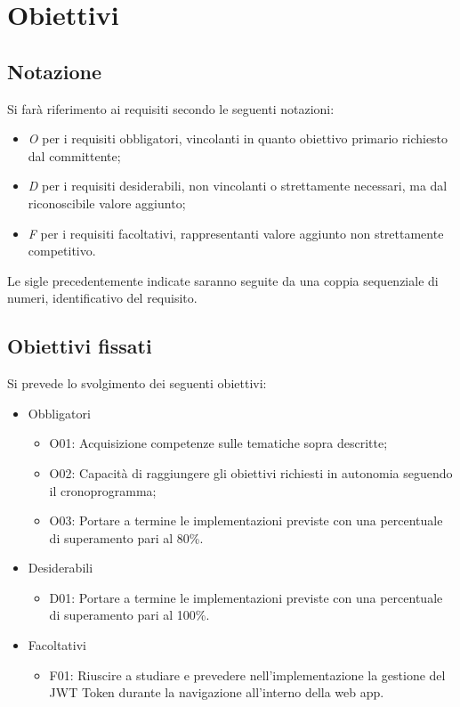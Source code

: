 \section*{Obiettivi}
\subsection*{Notazione}
Si farà riferimento ai requisiti secondo le seguenti notazioni:
\begin{itemize}
	\item \textit{O} per i requisiti obbligatori, vincolanti in quanto obiettivo primario richiesto dal committente;
	\item \textit{D} per i requisiti desiderabili, non vincolanti o strettamente necessari,
		  ma dal riconoscibile valore aggiunto;
	\item \textit{F} per i requisiti facoltativi, rappresentanti valore aggiunto non strettamente 
		  competitivo.
\end{itemize}

Le sigle precedentemente indicate saranno seguite da una coppia sequenziale di numeri, identificativo del requisito.

\subsection*{Obiettivi fissati}
Si prevede lo svolgimento dei seguenti obiettivi:
\begin{itemize}
	\item Obbligatori
	\begin{itemize}
		\item O01: Acquisizione competenze sulle tematiche sopra descritte;
		\item O02: Capacità di raggiungere gli obiettivi richiesti in autonomia seguendo il cronoprogramma;
		\item O03: Portare a termine le implementazioni previste con una percentuale di superamento pari al 80\%.
	\end{itemize}
	
	\item Desiderabili 
	\begin{itemize}
		\item D01: Portare a termine le implementazioni previste con una percentuale di superamento pari al 100\%.
	\end{itemize}
	
	\item Facoltativi
	\begin{itemize}
		\item F01: Riuscire a studiare e prevedere nell’implementazione la gestione del JWT Token durante la navigazione all’interno della web app.
	\end{itemize} 
\end{itemize}

\newpage
